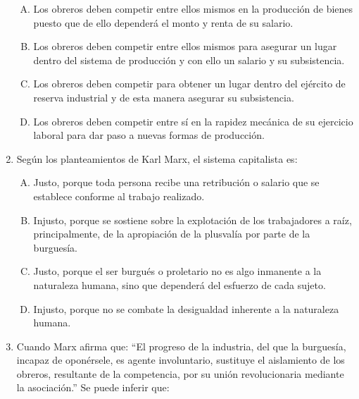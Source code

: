 \begin{enumerate}
\begin{enumerate}[(A)]

\item Los obreros deben competir entre ellos mismos en la producción de bienes puesto que de ello dependerá el monto y renta de su salario.
\item Los obreros deben competir entre ellos mismos para asegurar un lugar dentro del sistema de producción y con ello un salario y su subsistencia.
\item Los obreros deben competir para obtener un lugar dentro del ejército de reserva industrial y de esta manera asegurar su subsistencia.
\item Los obreros deben competir entre sí en la rapidez mecánica de su ejercicio laboral para dar paso a nuevas formas de producción.
\end{enumerate}


\item Según los planteamientos de Karl Marx, el sistema capitalista es:\label{socandres-10}

\begin{enumerate}[(A)]
\item Justo, porque toda persona recibe una retribución o salario que se establece conforme al trabajo realizado.
\item Injusto, porque se sostiene sobre la explotación de los trabajadores a raíz, principalmente, de la apropiación de la plusvalía por parte de la burguesía.
\item Justo, porque el ser burgués o proletario no es algo inmanente a la naturaleza humana, sino que dependerá del esfuerzo de cada sujeto.
\item Injusto, porque no se combate la desigualdad inherente a la naturaleza humana.
\end{enumerate}


\newpage
\item Cuando Marx afirma que: “El progreso de la industria, del que la burguesía, incapaz de oponérsele, es agente involuntario, sustituye el aislamiento de los obreros, resultante de la competencia, por su unión revolucionaria mediante la asociación.” Se puede inferir que:\label{socandres-9}


\end{enumerate}
